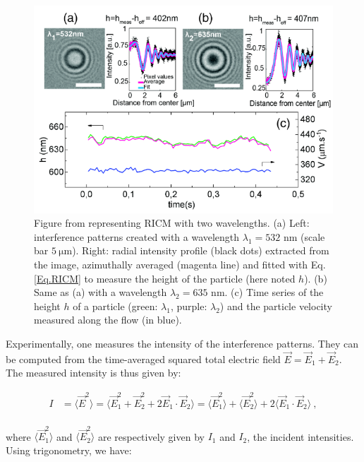 \begin{figure}[H]
	\centering
	\includegraphics[scale=1]{02_body/chapter2/images/RICM.png}
	\caption{Figure from \cite{davies_elastohydrodynamic_2018} representing \gls{RICM} with two wavelengths. (a) Left: interference patterns created with a wavelength $\lambda_1 = 532$ nm (scale bar $ 5~\mathrm{\mu m}$). 
		Right: radial intensity profile (black dots) extracted from the image, azimuthally averaged (magenta line) and fitted with Eq.\ref{Eq.RICM} to measure the height of the particle (here noted $h$). (b) Same as (a) with a wavelength $\lambda_2 = 635$ nm. (c) Time series of the height $h$ of a particle  (green: $ \lambda_1$, purple: $\lambda_2$) and the particle velocity measured along the flow (in blue). }
	\label{fig.RICM}
\end{figure}


Experimentally, one measures the intensity of the interference patterns. They can be computed from the time-averaged squared total electric field $\vec{E} = \vec{E}_1 + \vec{E}_2$. The measured intensity is thus given by:

\begin{equation}
	\begin{aligned}
		I & = \langle \vec{E}^2 \rangle = \langle \vec{E}_1^2 + \vec{E}_2^2 + 2\vec{E}_1 \cdot \vec{E}_2 \rangle 
		= \langle \vec{E}_1^2 \rangle + \langle \vec{E}_2^2 \rangle  + 2 \langle \vec{E}_1 \cdot \vec{E}_2 \rangle  ~,\\
	\end{aligned}
\end{equation} 

where $ \langle \vec{E}_1^2 \rangle $ and  $\langle \vec{E}_2^2 \rangle$ are respectively given by $I_1$ and $I_2$, the incident intensities. Using trigonometry, we have:

